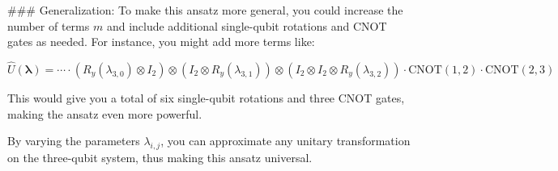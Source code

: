 ### Generalization:
To make this ansatz more general, you could increase the number of terms \( m \) and include additional single-qubit rotations and CNOT gates as needed. For instance, you might add more terms like:

\[
\hat{U}({\bm \lambda}) = \cdots \cdot \left( R_y(\lambda_{3,0}) \otimes I_2 \right) \otimes \left( I_2 \otimes R_y(\lambda_{3,1}) \right) \otimes \left( I_2 \otimes I_2 \otimes R_y(\lambda_{3,2}) \right) \cdot \text{CNOT}(1,2) \cdot \text{CNOT}(2,3)
\]

This would give you a total of six single-qubit rotations and three CNOT gates, making the ansatz even more powerful.

By varying the parameters \( \lambda_{i,j} \), you can approximate any unitary transformation on the three-qubit system, thus making this ansatz universal.